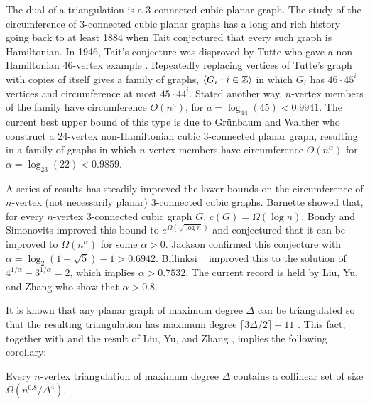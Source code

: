 \documentclass{patmorin}
\newcommand{\note}[2]{{\color{red}[#1:~#2]}}
\begin{document}
The dual of a triangulation is a 3-connected cubic planar graph.
The study of the circumference of 3-connected cubic planar graphs
has a long and rich history going back to at least 1884 when Tait
\cite{tait:remarks} conjectured that every such graph is Hamiltonian.  In
1946, Tait's conjecture was disproved by Tutte who gave a non-Hamiltonian
46-vertex example \cite{tutte:on}.  Repeatedly replacing vertices of
Tutte's graph with copies of itself gives a family of graphs, $\langle G_i:i\in
\mathbb{Z}\rangle$ in which $G_i$ has $46\cdot 45^i$ vertices and circumference at
most $45\cdot44^i$.  Stated another way, $n$-vertex members of the
family have circumference $O(n^a)$, for $a=\log_{44}(45) < 0.9941$.
The current best upper bound of this type is due to Gr\"unbaum and
Walther \cite{grunbaum.walther:shortness} who construct a 24-vertex
non-Hamiltonian cubic 3-connected planar graph, resulting in a family
of graphs in which $n$-vertex members have circumference $O(n^{\alpha})$
for $\alpha=\log_{23}(22)< 0.9859$.

A series of results has steadily improved the lower bounds on the
circumference of $n$-vertex  (not necessarily planar) 3-connected
cubic graphs.  Barnette \cite{barnette:trees} showed that, for
every $n$-vertex 3-connected cubic graph $G$, $c(G)=\Omega(\log n)$.
Bondy and Simonovits \cite{bondy.simonovits:longest} improved this bound
to $e^{\Omega(\sqrt{\log n})}$ and conjectured that it can be improved
to $\Omega(n^\alpha)$ for some $\alpha>0$.  Jackson \cite{jackson:longest}
confirmed this conjecture with $\alpha=\log_2(1+\sqrt{5})-1 > 0.6942$.
Billinksi \etal\ \cite{bilinksi.jackson.ea:circumference} improved
this to the solution of $4^{1/\alpha}-3^{1/\alpha}=2$, which implies
$\alpha>0.7532$.  The current record is held by Liu, Yu, and Zhang
\cite{liu.yu.zhang:circumference} who show that $\alpha>0.8$.  

It is known that any planar graph of maximum degree $\Delta$ can be
triangulated so that the resulting triangulation has maximum degree
$\lceil 3\Delta/2\rceil+11$ \cite{kant.bodlaender:triangulating}. This
fact, together with  and the result of Liu, Yu, and Zhang
\cite{liu.yu.zhang:circumference}, implies the following corollary:

\begin{cor}
  Every $n$-vertex triangulation of maximum degree $\Delta$ contains a
  collinear set of size $\Omega(n^{0.8}/\Delta^4)$.
\end{cor}

\end{document}
